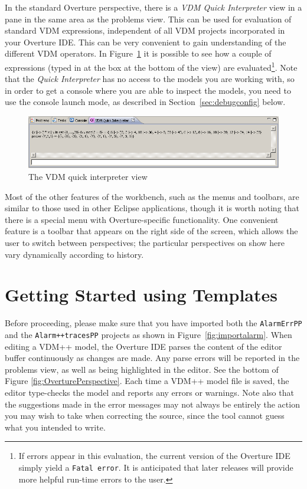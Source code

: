 In the standard Overture perspective, there is a \emph{VDM Quick   Interpreter} view in a pane in the same area as the problems view. This can be used for evaluation of standard VDM expressions, independent of all VDM projects incorporated in your Overture IDE. This can be very convenient to gain understanding of the different VDM operators. In Figure~\ref{fig:QuickIntView} it is possible to see how a couple of expressions (typed in at the box at the bottom of the view) are evaluated\footnote{If errors appear in this evaluation, the current version of the Overture IDE simply yield a \texttt{Fatal error}.  It is anticipated that later releases will provide more helpful run-time errors to the user.}.  Note that the \emph{Quick Interpreter} has no access to the models you are working with, so in order to get a console where you are able to inspect the models, you need to use the console launch mode, as described in Section~\ref{sec:debugconfig} below.
%
\begin{figure}[!htb]
\begin{center}
  \includegraphics[width=4.5in]{figures/quickinterpreter}
  \caption[labelInTOC]{The VDM quick interpreter view}
  \label{fig:QuickIntView}
\end{center}
\end{figure}
%
Most of the other features of the workbench, such as the menus and toolbars, are similar to those used in other Eclipse applications, though it is worth noting that there is a special menu with Overture-specific functionality. One convenient feature is a toolbar that appears on the right side of the screen, which allows the user to switch between perspectives; the particular perspectives on show here vary dynamically according to history.
%
\section{Getting Started using Templates}\label{sec:templates}
Before proceeding, please make sure that you have imported both the \texttt{AlarmErrPP} and the \texttt{Alarm++tracesPP} projects as shown in Figure~\ref{fig:importalarm}. When editing a VDM++ model, the Overture IDE parses the content of the editor buffer continuously as changes are made. Any parse errors will be reported in the problems view, as well as being highlighted in the editor. See the bottom of Figure \ref{fig:OverturePerspective}. Each time a VDM++ model file is saved, the editor type-checks the model and reports any errors or warnings. Note also that the suggestions made in the error messages may not always be entirely the action you may wish to take when correcting the source, since the tool cannot guess what you intended to write.

